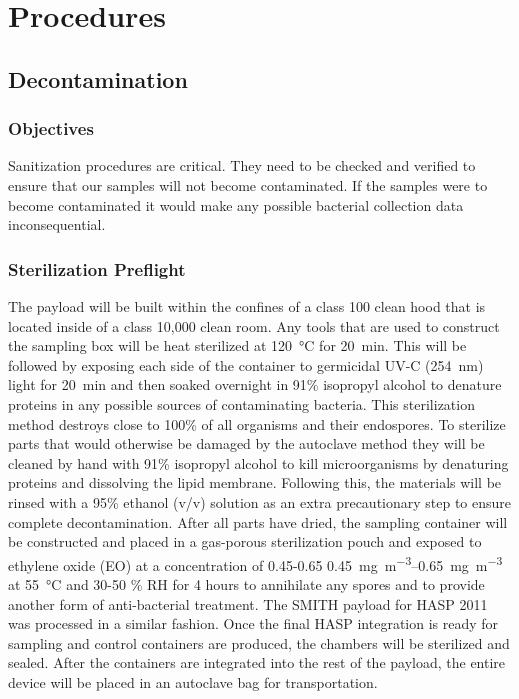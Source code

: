\section{Procedures}
\label{sec:Procedures}

\subsection{Decontamination}
\label{subsec:Decontamination}

\subsubsection{Objectives}
Sanitization procedures are critical. They need to be checked and verified to ensure that our samples will not become contaminated. If the samples were to become contaminated it would make any possible bacterial collection data inconsequential.

\subsubsection{Sterilization Preflight}
The payload will be built within the confines of a class 100 clean hood that is located inside of a class 10,000 clean room. Any tools that are used to construct the sampling box will be heat sterilized at \SI{120}{\celsius} for \SI{20}{\minute}. This will be followed by exposing each side of the container to germicidal UV-C (\SI{254}{\nano\meter}) light for \SI{20}{\minute} and then soaked overnight in 91\% isopropyl alcohol to denature proteins in any possible sources of contaminating bacteria. This sterilization method destroys close to 100\% of all organisms and their endospores. To sterilize parts that would otherwise be damaged by the autoclave method they will be cleaned by hand with 91\% isopropyl alcohol to kill microorganisms by denaturing proteins and dissolving the lipid membrane. Following this, the materials will be rinsed with a 95\% ethanol (v/v) solution as an extra precautionary step to ensure complete decontamination. After all parts have dried, the sampling container will be constructed and placed in a gas-porous sterilization pouch and exposed to ethylene oxide (EO) at a concentration of 0.45-0.65 \SIrange{0.45}{0.65}{\milli\gram\per\meter\cubed} at \SI{55}{\celsius} and 30-50 \% RH for \num{4} hours to annihilate any spores and to provide another form of anti-bacterial treatment. The SMITH payload for HASP 2011 was processed in a similar fashion. Once the final HASP integration is ready for sampling and control containers are produced, the chambers will be sterilized and sealed. After the containers are integrated into the rest of the payload, the entire device will be placed in an autoclave bag for transportation.


